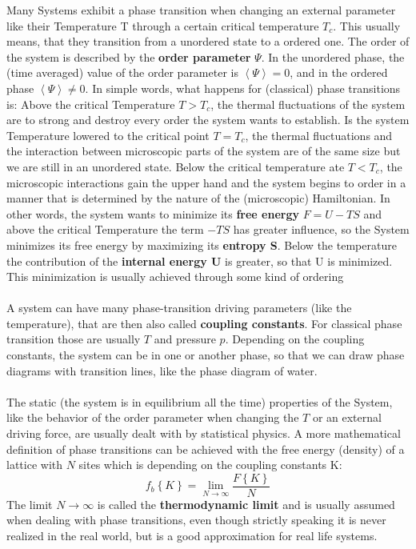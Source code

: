 	Many Systems exhibit a phase transition when changing an external parameter like their Temperature T through a certain critical temperature $T_c$. This usually means, that they transition from a unordered state to a ordered one. The order of the system is described by the \textbf{order parameter} $\Psi$. In the unordered phase, the (time averaged) value of the order parameter is $\left\langle \Psi \right\rangle = 0$, and in the ordered phase $\left\langle \Psi \right\rangle \neq 0$. In simple words, what happens for (classical) phase transitions is: Above the critical Temperature $T > T_c$, the thermal fluctuations of the system are to strong and destroy every order the system wants to establish. Is the system Temperature lowered to the critical point $T = T_c$, the thermal fluctuations and the interaction between microscopic parts of the system are of the same size but we are still in an unordered state. Below the critical temperature ate $T < T_c$, the microscopic interactions gain the upper hand and the system begins to order in a manner that is determined by the nature of the (microscopic) Hamiltonian. In other words, the system wants to minimize its \textbf{free energy} $F =	U - TS$ and above the critical Temperature the term $-TS$ has greater influence, so the System minimizes its free energy by maximizing its \textbf{entropy S}. Below the temperature the contribution of the \textbf{internal energy U} is greater, so that U is minimized. This minimization is usually achieved through some kind of ordering
	\\
	\\
	A system can have many phase-transition driving parameters (like the temperature), that are then also called \textbf{coupling constants}. For classical phase transition those are usually $T$ and pressure $p$. Depending on the coupling constants, the system can be in one or another phase, so that we can draw phase diagrams with transition lines, like the phase diagram of water.
	\\
	\\
	The static (the system is in equilibrium all the time) properties of the System, like the behavior of the order parameter when changing the $T$ or an external driving force, are usually dealt with by statistical physics. A more mathematical definition of phase transitions can be achieved with the free energy (density) of a lattice with $N$ sites which is depending on the coupling constants K:
	\begin{equation}
		f_b\left\lbrace K \right\rbrace = \lim_{N \rightarrow \infty} \frac{F\left\lbrace K \right\rbrace}{N}
	\end{equation}
	The limit $N \rightarrow \infty$ is called the \textbf{thermodynamic limit} and is usually assumed when dealing with phase transitions, even though strictly speaking it is never realized in the real world, but is a good approximation for real life systems.
	
